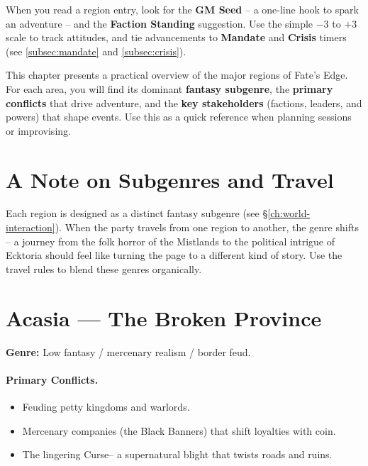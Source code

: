 \begin{tcolorbox}[colback=blue!5!white, colframe=blue!75!black, title=Using This Compendium,breakable]
\medskip
When you read a region entry, look for the \textbf{GM Seed} -- a one-line hook to spark an adventure -- and the \textbf{Faction Standing} suggestion. Use the simple \(-3\) to \(+3\) scale to track attitudes, and tie advancements to \textbf{Mandate} and \textbf{Crisis} timers (see \ref{subsec:mandate} and \ref{subsec:crisis}).
\end{tcolorbox}

This chapter presents a practical overview of the major regions of Fate's Edge. For each area, you will find its dominant \textbf{fantasy subgenre}, the \textbf{primary conflicts} that drive adventure, and the \textbf{key stakeholders} (factions, leaders, and powers) that shape events. Use this as a quick reference when planning sessions or improvising.

\section{A Note on Subgenres and Travel}

Each region is designed as a distinct fantasy subgenre (see \S\ref{ch:world-interaction}). When the party travels from one region to another, the genre shifts -- a journey from the folk horror of the Mistlands to the political intrigue of Ecktoria should feel like turning the page to a different kind of story. Use the travel rules to blend these genres organically.

\section{Acasia --- \textquotedbl The Broken Province\textquotedbl}
\textbf{Genre:} Low fantasy / mercenary realism / border feud.

\paragraph{Primary Conflicts.}
\begin{itemize}
  \item Feuding petty kingdoms and warlords.
  \item Mercenary companies (the Black Banners) that shift loyalties with coin.
  \item The lingering \textquotedbl Curse\textquotedbl -- a supernatural blight that twists roads and ruins.
\end{itemize}

